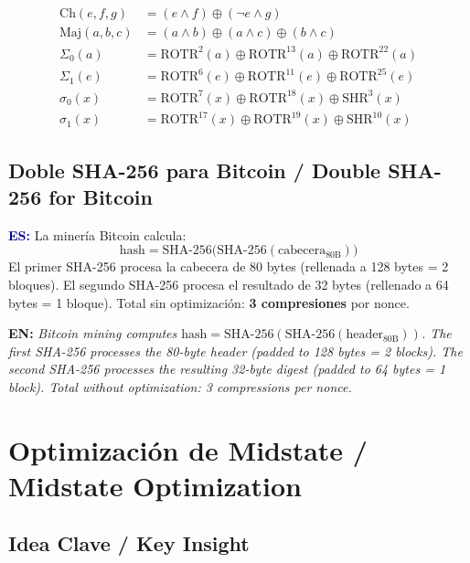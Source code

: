 \documentclass[12pt,a4paper]{article}
\newcommand{\bsection}[2]{%
    \section{#1 \textnormal{\normalsize\color{accentblue}/ #2}}%
}
\newcommand{\bsubsection}[2]{%
    \subsection{#1 \textnormal{\small\color{accentblue}/ #2}}%
}
\newenvironment{bilingual}{%
    \par\medskip
}{%
    \par\medskip
}
\newcommand{\espara}[1]{\noindent\textcolor{darkblue}{\textbf{ES:}} #1\par\smallskip}
\newcommand{\enpara}[1]{\noindent\textcolor{accentblue}{\textbf{EN:}} \textit{#1}\par\smallskip}
\begin{document}
\begin{align}
    \text{Ch}(e,f,g)  &= (e \wedge f) \oplus (\neg e \wedge g) \\
    \text{Maj}(a,b,c) &= (a \wedge b) \oplus (a \wedge c) \oplus (b \wedge c) \\
    \Sigma_0(a)        &= \text{ROTR}^2(a) \oplus \text{ROTR}^{13}(a) \oplus \text{ROTR}^{22}(a) \\
    \Sigma_1(e)        &= \text{ROTR}^6(e) \oplus \text{ROTR}^{11}(e) \oplus \text{ROTR}^{25}(e) \\
    \sigma_0(x)        &= \text{ROTR}^7(x) \oplus \text{ROTR}^{18}(x) \oplus \text{SHR}^3(x) \\
    \sigma_1(x)        &= \text{ROTR}^{17}(x) \oplus \text{ROTR}^{19}(x) \oplus \text{SHR}^{10}(x)
\end{align}

\bsubsection{Doble SHA-256 para Bitcoin}{Double SHA-256 for Bitcoin}

\begin{bilingual}
\espara{%
La miner\'ia Bitcoin calcula:
\[
    \text{hash} = \text{SHA-256}\bigl(\text{SHA-256}(\text{cabecera}_{80\text{B}})\bigr)
\]
El primer SHA-256 procesa la cabecera de 80 bytes (rellenada a 128 bytes = 2 bloques).
El segundo SHA-256 procesa el resultado de 32 bytes (rellenado a 64 bytes = 1 bloque).
Total sin optimizaci\'on: \textbf{3 compresiones} por nonce.}

\enpara{%
Bitcoin mining computes
$\text{hash} = \text{SHA-256}(\text{SHA-256}(\text{header}_{80\text{B}}))$.
The first SHA-256 processes the 80-byte header (padded to 128 bytes = 2 blocks).
The second SHA-256 processes the resulting 32-byte digest (padded to 64 bytes = 1 block).
Total without optimization: 3 compressions per nonce.}
\end{bilingual}

\bsection{Optimizaci\'on de Midstate}{Midstate Optimization}

\bsubsection{Idea Clave}{Key Insight}
\end{document}
